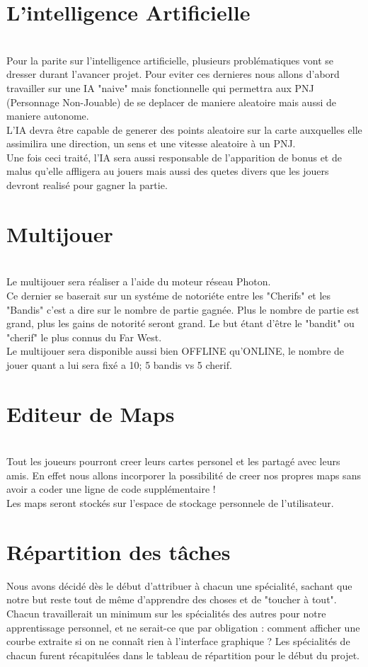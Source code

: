 \documentclass[12pt]{report}
\begin{document}
    \section{L'intelligence Artificielle}
\\ Pour la parite sur l'intelligence artificielle, plusieurs problématiques vont se dresser durant l'avancer projet.
Pour eviter ces dernieres nous allons d'abord travailler sur une IA "naive" mais fonctionnelle qui permettra aux PNJ (Personnage Non-Jouable) de se deplacer de maniere aleatoire mais aussi de maniere autonome.\\ L'IA devra être capable de generer des points aleatoire sur la carte auxquelles elle assimilira une direction, un sens et une vitesse aleatoire à un PNJ.\\ Une fois ceci traité, l'IA sera aussi responsable de l'apparition de bonus et de malus qu'elle affligera au jouers mais aussi des quetes divers que les jouers devront realisé pour gagner la partie.
    \section{Multijouer}
\\ Le multijouer sera réaliser a l'aide du moteur réseau Photon. \\
Ce dernier se baserait sur un systéme de notoriéte entre les "Cherifs" 
et les "Bandis" c'est a dire sur le nombre de partie gagnée. Plus le nombre de partie est grand, plus les gains de notorité seront grand. Le but étant d'être le "bandit" ou "cherif" le plus connus du Far West. 
\\ Le multijouer sera disponible aussi bien OFFLINE qu'ONLINE, le nombre de jouer quant a lui sera fixé a 10; 5 bandis vs 5 cherif.
    \section{Editeur de Maps}
\\ 
Tout les joueurs pourront creer leurs cartes personel et les partagé avec leurs amis. En effet nous allons incorporer la possibilité de creer nos propres maps sans avoir a coder une ligne de code supplémentaire !\\ Les maps seront stockés sur l'espace de stockage personnele de l'utilisateur.
    \section{Répartition des tâches} 

Nous avons décidé dès le début d'attribuer à chacun une
spécialité, sachant que notre but reste tout de même d'apprendre
des choses et de "toucher à tout". Chacun travaillerait un minimum
sur les spécialités des autres pour notre apprentissage personnel,
et ne serait-ce que par obligation : comment afficher une courbe
extraite si on ne connaît rien à l'interface graphique ?
Les spécialités de chacun furent récapitulées dans le tableau de répartition pour le début du projet.\\
\end{document}
